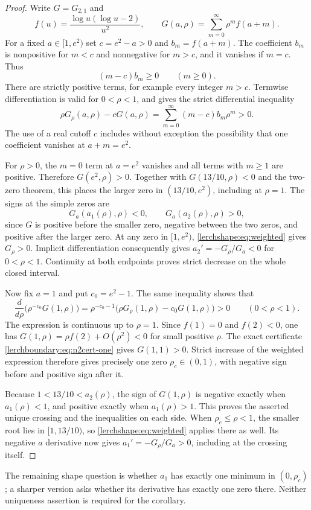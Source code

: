 \begin{proof}
Write $G=G_{2,1}$ and
\[
 f(u)=\frac{\log u(\log u-2)}{u^2},\qquad
 G(a,\rho)=\sum_{m=0}^{\infty}\rho^m f(a+m).
\]
For a fixed $a\in[1,e^2)$ set $c=e^2-a>0$ and $b_m=f(a+m)$.
The coefficient $b_m$ is nonpositive for $m<c$ and nonnegative
for $m>c$, and it vanishes if $m=c$. Thus
\[
 (m-c)b_m\geq0\qquad(m\geq0).
\]
There are strictly positive terms, for example every integer $m>c$.
Termwise differentiation is valid for $0<\rho<1$, and gives the
strict differential inequality
\begin{equation}\label{lerchshape:eq:weighted}
 \rho G_\rho(a,\rho)-cG(a,\rho)
   =\sum_{m=0}^{\infty}(m-c)b_m\rho^m>0.
\end{equation}
The use of a real cutoff $c$ includes without exception the possibility
that one coefficient vanishes at $a+m=e^2$.

For $\rho>0$, the $m=0$ term at $a=e^2$ vanishes and all terms with
$m\geq1$ are positive. Therefore $G(e^2,\rho)>0$. Together with
$G(13/10,\rho)<0$ and the two-zero theorem, this places the larger
zero in $(13/10,e^2)$, including at $\rho=1$. The signs at the
simple zeros are
\[
 G_a(a_1(\rho),\rho)<0,
 \qquad G_a(a_2(\rho),\rho)>0,
\]
since $G$ is positive before the smaller zero, negative between
the two zeros, and positive after the larger zero. At any zero
in $[1,e^2)$, \eqref{lerchshape:eq:weighted} gives $G_\rho>0$.
Implicit differentiation consequently gives $a_2'=-G_\rho/G_a<0$
for $0<\rho<1$. Continuity at both endpoints proves strict decrease
on the whole closed interval.

Now fix $a=1$ and put $c_0=e^2-1$. The same inequality shows that
\[
 \frac{d}{d\rho}\bigl(\rho^{-c_0}G(1,\rho)\bigr)
 =\rho^{-c_0-1}\bigl(\rho G_\rho(1,\rho)-c_0G(1,\rho)\bigr)>0
 \qquad(0<\rho<1).
\]
The expression is continuous up to $\rho=1$. Since $f(1)=0$ and
$f(2)<0$, one has $G(1,\rho)=\rho f(2)+O(\rho^2)<0$ for small
positive $\rho$. The exact certificate
\eqref{lerchboundary:eq:n2cert-one} gives $G(1,1)>0$.
Strict increase of the weighted expression therefore gives precisely
one zero $\rho_c\in(0,1)$, with negative sign before and positive
sign after it.

Because $1<13/10<a_2(\rho)$, the sign of $G(1,\rho)$ is negative
exactly when $a_1(\rho)<1$, and positive exactly when $a_1(\rho)>1$.
This proves the asserted unique crossing and the inequalities on
each side. When $\rho_c\leq\rho<1$, the smaller root lies in
$[1,13/10)$, so \eqref{lerchshape:eq:weighted} applies there as well.
Its negative $a$ derivative now gives $a_1'=-G_\rho/G_a>0$,
including at the crossing itself.
\end{proof}

The remaining shape question is whether $a_1$ has exactly one minimum
in $(0,\rho_c)$; a sharper version asks whether its derivative has
exactly one zero there. Neither uniqueness assertion is required for
the corollary.
